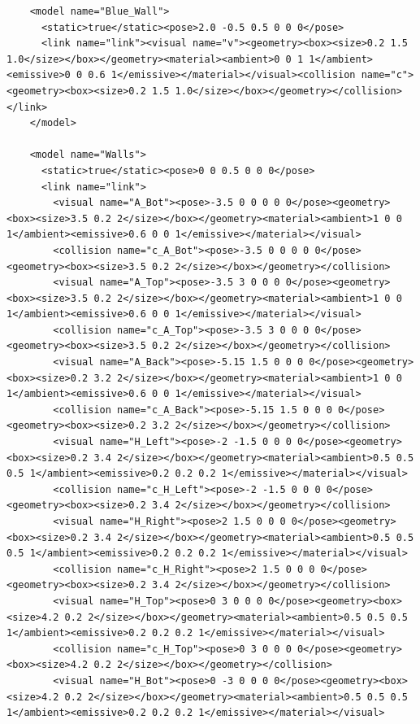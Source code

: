 \begin{lstlisting}
    <model name="Blue_Wall">
      <static>true</static><pose>2.0 -0.5 0.5 0 0 0</pose>
      <link name="link"><visual name="v"><geometry><box><size>0.2 1.5 1.0</size></box></geometry><material><ambient>0 0 1 1</ambient><emissive>0 0 0.6 1</emissive></material></visual><collision name="c"><geometry><box><size>0.2 1.5 1.0</size></box></geometry></collision></link>
    </model>

    <model name="Walls">
      <static>true</static><pose>0 0 0.5 0 0 0</pose>
      <link name="link">
        <visual name="A_Bot"><pose>-3.5 0 0 0 0 0</pose><geometry><box><size>3.5 0.2 2</size></box></geometry><material><ambient>1 0 0 1</ambient><emissive>0.6 0 0 1</emissive></material></visual>
        <collision name="c_A_Bot"><pose>-3.5 0 0 0 0 0</pose><geometry><box><size>3.5 0.2 2</size></box></geometry></collision>
        <visual name="A_Top"><pose>-3.5 3 0 0 0 0</pose><geometry><box><size>3.5 0.2 2</size></box></geometry><material><ambient>1 0 0 1</ambient><emissive>0.6 0 0 1</emissive></material></visual>
        <collision name="c_A_Top"><pose>-3.5 3 0 0 0 0</pose><geometry><box><size>3.5 0.2 2</size></box></geometry></collision>
        <visual name="A_Back"><pose>-5.15 1.5 0 0 0 0</pose><geometry><box><size>0.2 3.2 2</size></box></geometry><material><ambient>1 0 0 1</ambient><emissive>0.6 0 0 1</emissive></material></visual>
        <collision name="c_A_Back"><pose>-5.15 1.5 0 0 0 0</pose><geometry><box><size>0.2 3.2 2</size></box></geometry></collision>
        <visual name="H_Left"><pose>-2 -1.5 0 0 0 0</pose><geometry><box><size>0.2 3.4 2</size></box></geometry><material><ambient>0.5 0.5 0.5 1</ambient><emissive>0.2 0.2 0.2 1</emissive></material></visual>
        <collision name="c_H_Left"><pose>-2 -1.5 0 0 0 0</pose><geometry><box><size>0.2 3.4 2</size></box></geometry></collision>
        <visual name="H_Right"><pose>2 1.5 0 0 0 0</pose><geometry><box><size>0.2 3.4 2</size></box></geometry><material><ambient>0.5 0.5 0.5 1</ambient><emissive>0.2 0.2 0.2 1</emissive></material></visual>
        <collision name="c_H_Right"><pose>2 1.5 0 0 0 0</pose><geometry><box><size>0.2 3.4 2</size></box></geometry></collision>
        <visual name="H_Top"><pose>0 3 0 0 0 0</pose><geometry><box><size>4.2 0.2 2</size></box></geometry><material><ambient>0.5 0.5 0.5 1</ambient><emissive>0.2 0.2 0.2 1</emissive></material></visual>
        <collision name="c_H_Top"><pose>0 3 0 0 0 0</pose><geometry><box><size>4.2 0.2 2</size></box></geometry></collision>
        <visual name="H_Bot"><pose>0 -3 0 0 0 0</pose><geometry><box><size>4.2 0.2 2</size></box></geometry><material><ambient>0.5 0.5 0.5 1</ambient><emissive>0.2 0.2 0.2 1</emissive></material></visual>

\end{lstlisting}
